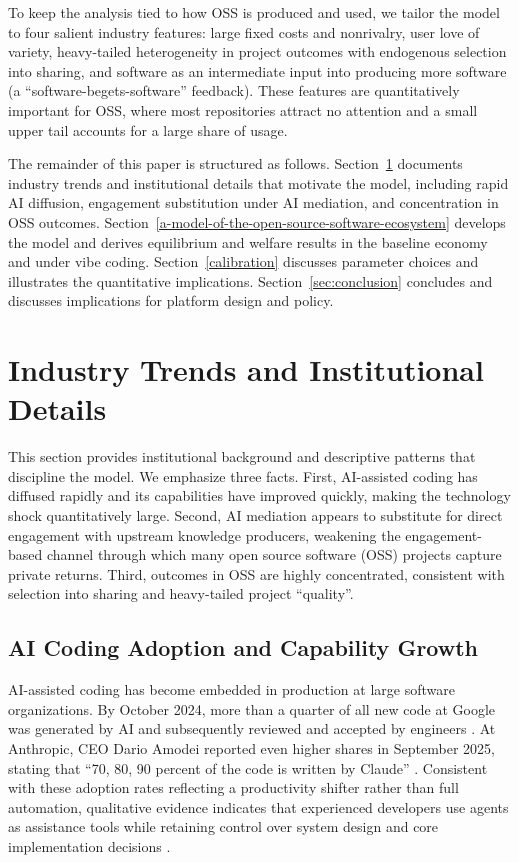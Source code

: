 \documentclass[11pt,a4paper]{article}
\theoremstyle{definition}
\theoremstyle{remark}
\begin{document}
To keep the analysis tied to how OSS is produced and used, we tailor the model to four salient industry features: large fixed costs and nonrivalry, user love of variety, heavy-tailed heterogeneity in project outcomes with endogenous selection into sharing, and software as an intermediate input into producing more software (a ``software-begets-software'' feedback). These features are quantitatively important for OSS, where most repositories attract no attention and a small upper tail accounts for a large share of usage. 

The remainder of this paper is structured as follows. Section~\ref{sec:industry} documents industry trends and institutional details that motivate the model, including rapid AI diffusion, engagement substitution under AI mediation, and concentration in OSS outcomes. Section~\ref{a-model-of-the-open-source-software-ecosystem} develops the model and derives equilibrium and welfare results in the baseline economy and under vibe coding. Section~\ref{calibration} discusses parameter choices and illustrates the quantitative implications. Section~\ref{sec:conclusion} concludes and discusses implications for platform design and policy.
\section{Industry Trends and Institutional Details}\label{sec:industry}

This section provides institutional background and descriptive patterns that discipline the model. We emphasize three facts. First, AI-assisted coding has diffused rapidly and its capabilities have improved quickly, making the technology shock quantitatively large. Second, AI mediation appears to substitute for direct engagement with upstream knowledge producers, weakening the engagement-based channel through which many open source software (OSS) projects capture private returns. Third, outcomes in OSS are highly concentrated, consistent with selection into sharing and heavy-tailed project ``quality''.

\subsection{AI Coding Adoption and Capability Growth}

AI-assisted coding has become embedded in production at large software organizations. By October 2024, more than a quarter of all new code at Google was generated by AI and subsequently reviewed and accepted by engineers \citep{pichai-2024}. At Anthropic, CEO Dario Amodei reported even higher shares in September 2025, stating that ``70, 80, 90 percent of the code is written by Claude'' \citep{amodei-2025}. Consistent with these adoption rates reflecting a productivity shifter rather than full automation, qualitative evidence indicates that experienced developers use agents as assistance tools while retaining control over system design and core implementation decisions \citep{huang-2025-control}.
\end{document}

